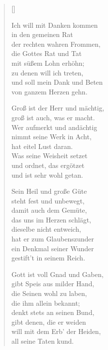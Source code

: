 \begin{multicols}{2}
\settowidth{\versewidth}{Groß ist der Herr und mächtig}
\begin{verse}[\versewidth]

 Ich will mit Danken kommen\\
in den gemeinen Rat\\
der rechten wahren Frommen,\\
die Gottes Rat und Tat\\
mit süßem Lohn erhöhn;\\
zu denen will ich treten,\\
und soll mein Dank und Beten\\
von ganzem Herzen gehn.

 Groß ist der Herr und mächtig,\\
groß ist auch, was er macht.\\
Wer aufmerkt und andächtig\\
nimmt seine Werk in Acht,\\
hat eitel Lust daran.\\
Was seine Weisheit setzet\\
und ordnet, das ergötzet\\
und ist sehr wohl getan.

 Sein Heil und große Güte\\
steht fest und unbewegt,\\
damit auch dem Gemüte,\\
das uns im Herzen schlägt,\\
dieselbe nicht entweich,\\
hat er zum Glaubenszunder\\
ein Denkmal seiner Wunder\\
gestift't in seinem Reich.

 Gott ist voll Gnad und Gaben,\\
gibt Speis aus milder Hand,\\
die Seinen wohl zu laben,\\
die ihm allein bekannt;\\
denkt stets an seinen Bund,\\
gibt denen, die er weiden\\
will mit dem Erb' der Heiden,\\
all seine Taten kund.


\end{verse}
\end{multicols}
